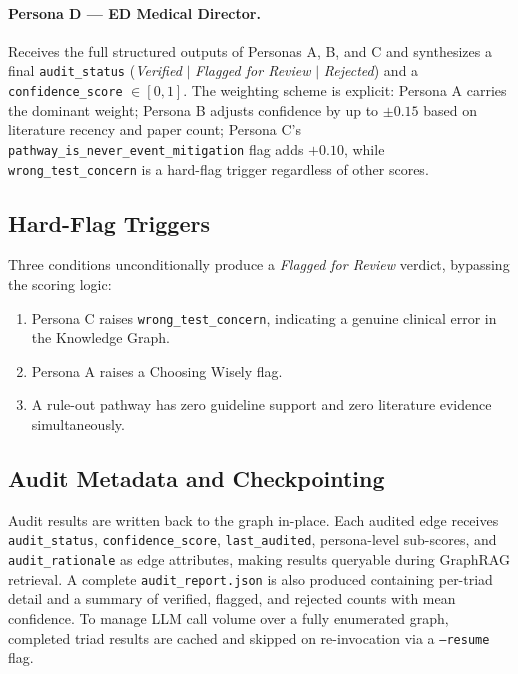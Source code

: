 \paragraph{Persona D — ED Medical Director.}
Receives the full structured outputs of Personas A, B, and C and synthesizes a
final \texttt{audit\_status} (\textit{Verified} $|$ \textit{Flagged for Review}
$|$ \textit{Rejected}) and a \texttt{confidence\_score} $\in [0, 1]$. The
weighting scheme is explicit: Persona A carries the dominant weight; Persona B
adjusts confidence by up to $\pm 0.15$ based on literature recency and paper
count; Persona C's \texttt{pathway\_is\_never\_event\_mitigation} flag adds
$+0.10$, while \texttt{wrong\_test\_concern} is a hard-flag trigger regardless
of other scores.

\subsection*{Hard-Flag Triggers}

Three conditions unconditionally produce a \textit{Flagged for Review} verdict,
bypassing the scoring logic:
\begin{enumerate}
    \item Persona C raises \texttt{wrong\_test\_concern}, indicating a genuine
    clinical error in the Knowledge Graph.
    \item Persona A raises a Choosing Wisely flag.
    \item A rule-out pathway has zero guideline support and zero literature
    evidence simultaneously.
\end{enumerate}

\subsection*{Audit Metadata and Checkpointing}

Audit results are written back to the graph in-place. Each audited edge
receives \texttt{audit\_status}, \texttt{confidence\_score},
\texttt{last\_audited}, persona-level sub-scores, and \texttt{audit\_rationale}
as edge attributes, making results queryable during GraphRAG retrieval. A
complete \texttt{audit\_report.json} is also produced containing per-triad
detail and a summary of verified, flagged, and rejected counts with mean
confidence. To manage LLM call volume over a fully enumerated graph, completed
triad results are cached and skipped on re-invocation via a \texttt{--resume}
flag.

\newpage
